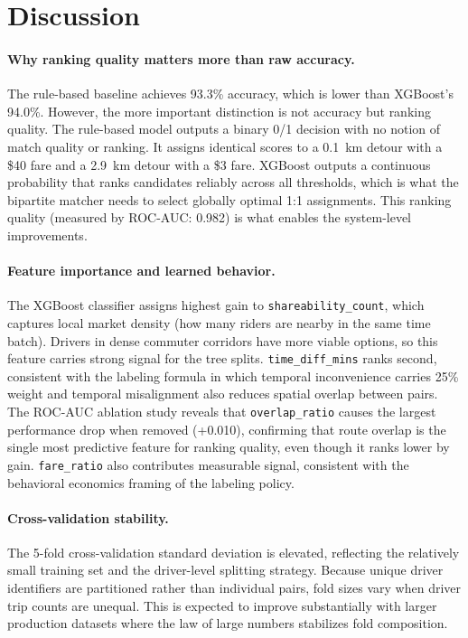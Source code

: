 \documentclass{article}
\begin{document}
\section{Discussion}
\label{sec:discussion}

\paragraph{Why ranking quality matters more than raw accuracy.}
The rule-based baseline achieves 93.3\% accuracy, which is lower than XGBoost's 94.0\%. However, the more important distinction is not accuracy but ranking quality. The rule-based model outputs a binary 0/1 decision with no notion of match quality or ranking. It assigns identical scores to a 0.1~km detour with a \$40 fare and a 2.9~km detour with a \$3 fare. XGBoost outputs a continuous probability that ranks candidates reliably across all thresholds, which is what the bipartite matcher needs to select globally optimal 1:1 assignments. This ranking quality (measured by ROC-AUC: 0.982) is what enables the system-level improvements.

\paragraph{Feature importance and learned behavior.}
The XGBoost classifier assigns highest gain to \texttt{shareability\_count}, which captures local market density (how many riders are nearby in the same time batch). Drivers in dense commuter corridors have more viable options, so this feature carries strong signal for the tree splits. \texttt{time\_diff\_mins} ranks second, consistent with the labeling formula in which temporal inconvenience carries 25\% weight and temporal misalignment also reduces spatial overlap between pairs. The ROC-AUC ablation study reveals that \texttt{overlap\_ratio} causes the largest performance drop when removed (+0.010), confirming that route overlap is the single most predictive feature for ranking quality, even though it ranks lower by gain. \texttt{fare\_ratio} also contributes measurable signal, consistent with the behavioral economics framing of the labeling policy.

\paragraph{Cross-validation stability.}
The 5-fold cross-validation standard deviation is elevated, reflecting the relatively small training set and the driver-level splitting strategy. Because unique driver identifiers are partitioned rather than individual pairs, fold sizes vary when driver trip counts are unequal. This is expected to improve substantially with larger production datasets where the law of large numbers stabilizes fold composition.
\end{document}
